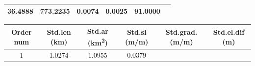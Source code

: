 \documentclass[11pt,]{article}
\begin{document}
\begin{longtable}[]{@{}cccccc@{}}
\begin{minipage}[t]{0.11\columnwidth}
36.4888\strut
\end{minipage} & \begin{minipage}[t]{0.25\columnwidth}\centering\strut
773.2235\strut
\end{minipage} & \begin{minipage}[t]{0.11\columnwidth}\centering\strut
0.0074\strut
\end{minipage} & \begin{minipage}[t]{0.14\columnwidth}\centering\strut
0.0025\strut
\end{minipage} & \begin{minipage}[t]{0.13\columnwidth}\centering\strut
91.0000\strut
\end{minipage}\tabularnewline
\bottomrule
\end{longtable}

\begin{longtable}[]{@{}cccccc@{}}
\toprule
\begin{minipage}[b]{0.08\columnwidth}\centering\strut
Order num\strut
\end{minipage} & \begin{minipage}[b]{0.11\columnwidth}\centering\strut
Std.len (km)\strut
\end{minipage} & \begin{minipage}[b]{0.26\columnwidth}\centering\strut
Std.ar (km\textsuperscript{2})\strut
\end{minipage} & \begin{minipage}[b]{0.11\columnwidth}\centering\strut
Std.sl (m/m)\strut
\end{minipage} & \begin{minipage}[b]{0.14\columnwidth}\centering\strut
Std.grad. (m/m)\strut
\end{minipage} & \begin{minipage}[b]{0.13\columnwidth}\centering\strut
Std.el.dif (m)\strut
\end{minipage}\tabularnewline
\midrule
\endhead
\begin{minipage}[t]{0.08\columnwidth}\centering\strut
1\strut
\end{minipage} & \begin{minipage}[t]{0.11\columnwidth}\centering\strut
1.0274\strut
\end{minipage} & \begin{minipage}[t]{0.26\columnwidth}\centering\strut
1.0955\strut
\end{minipage} & \begin{minipage}[t]{0.11\columnwidth}\centering\strut
0.0379\strut

\end{minipage}
\end{longtable}
\end{document}
